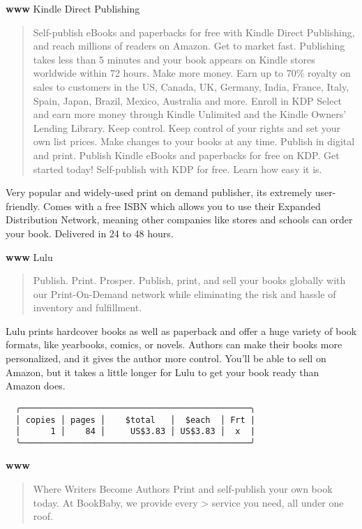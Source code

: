 \documentclass[
]{article}
\begin{document}
\textbf{www} Kindle Direct Publishing

\begin{quote}
Self-publish eBooks and paperbacks for free with Kindle Direct
Publishing, and reach millions of readers on Amazon. Get to market fast.
Publishing takes less than 5 minutes and your book appears on Kindle
stores worldwide within 72 hours. Make more money. Earn up to 70\%
royalty on sales to customers in the US, Canada, UK, Germany, India,
France, Italy, Spain, Japan, Brazil, Mexico, Australia and more. Enroll
in KDP Select and earn more money through Kindle Unlimited and the
Kindle Owners' Lending Library. Keep control. Keep control of your
rights and set your own list prices. Make changes to your books at any
time. Publish in digital and print. Publish Kindle eBooks and paperbacks
for free on KDP. Get started today! Self-publish with KDP for free.
Learn how easy it is.
\end{quote}

Very popular and widely-used print on demand publisher, its extremely
user-friendly. Comes with a free ISBN which allows you to use their
Expanded Distribution Network, meaning other companies like stores and
schools can order your book. Delivered in 24 to 48 hours.

\textbf{www} Lulu

\begin{quote}
Publish. Print. Prosper. Publish, print, and sell your books globally
with our Print-On-Demand network while eliminating the risk and hassle
of inventory and fulfillment.
\end{quote}

Lulu prints hardcover books as well as paperback and offer a huge
variety of book formats, like yearbooks, comics, or novels. Authors can
make their books more personalized, and it gives the author more
control. You'll be able to sell on Amazon, but it takes a little longer
for Lulu to get your book ready than Amazon does.

\begin{verbatim}
  ╭──────────────────────────────────────────────╮ 
  │ copies │ pages │    $total   │  $each  │ Frt | 
  │      1 │    84 │     US$3.83 │ US$3.83 │  x  | 
  ╰──────────────────────────────────────────────╯ 
\end{verbatim}

\textbf{www}

\begin{quote}
Where Writers Become Authors Print and self-publish your own book today.
At BookBaby, we provide every \textgreater{} service you need, all under
one roof.
\end{quote}
\end{document}
